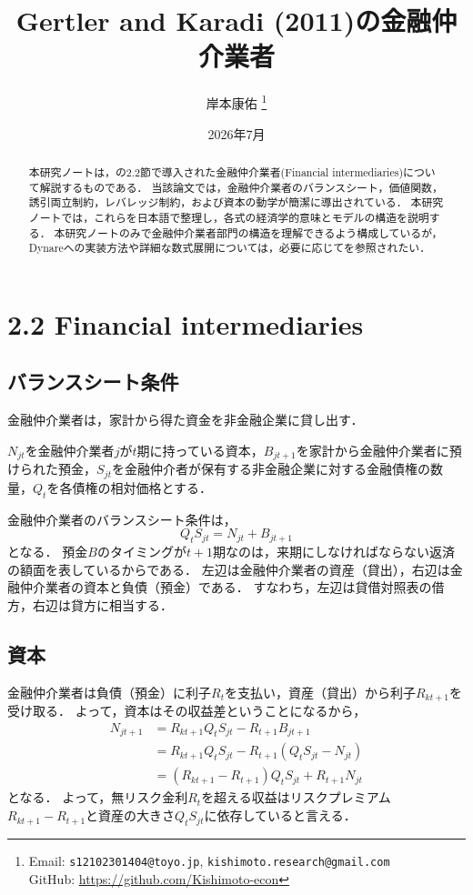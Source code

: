 \documentclass[dvipdfmx]{jlreq}
\title{
\vspace{-3cm}
Gertler and Karadi (2011)の金融仲介業者
}
\author{
  岸本康佑
  \thanks{
  Email: \texttt{s12102301404@toyo.jp}, \texttt{kishimoto.research@gmail.com} \\
  GitHub: \url{https://github.com/Kishimoto-econ}
}}
\date{2026年7月}
\begin{document}
\maketitle

\begin{abstract}
本研究ノートは，\textcite{GK2011}の2.2節で導入された金融仲介業者(Financial intermediaries)について解説するものである．
当該論文では，金融仲介業者のバランスシート，価値関数，誘引両立制約，レバレッジ制約，および資本の動学が簡潔に導出されている．
本研究ノートでは，これらを日本語で整理し，各式の経済学的意味とモデルの構造を説明する．
本研究ノートのみで金融仲介業者部門の構造を理解できるよう構成しているが，Dynareへの実装方法や詳細な数式展開については，必要に応じて\textcite{V2021}を参照されたい．
\end{abstract}

\section*{2.2 Financial intermediaries}
\subsection*{バランスシート条件}
金融仲介業者は，家計から得た資金を非金融企業に貸し出す．

$N_{jt}$を金融仲介業者$j$が$t$期に持っている資本，$B_{jt+1}$を家計から金融仲介業者に預けられた預金，$S_{jt}$を金融仲介者が保有する非金融企業に対する金融債権の数量，$Q_t$を各債権の相対価格とする．

金融仲介業者のバランスシート条件は，
\begin{equation}
  Q_t S_{jt} = N_{jt} + B_{jt+1}
\end{equation}
となる．
預金$B$のタイミングが$t+1$期なのは，来期にしなければならない返済の額面を表しているからである．
左辺は金融仲介業者の資産（貸出），右辺は金融仲介業者の資本と負債（預金）である．
すなわち，左辺は貸借対照表の借方，右辺は貸方に相当する．

\subsection*{資本}
金融仲介業者は負債（預金）に利子$R_t$を支払い，資産（貸出）から利子$R_{kt+1}$を受け取る．
よって，資本はその収益差ということになるから，
\begin{align}
  N_{jt+1} &= R_{kt+1} Q_t S_{jt} - R_{t+1} B_{jt+1} \\
  &= R_{kt+1} Q_t S_{jt} - R_{t+1} (Q_t S_{jt} - N_{jt}) \\
  &= (R_{kt+1} - R_{t+1}) Q_t S_{jt} + R_{t+1} N_{jt} \label{eq:7}
\end{align}
となる．
よって，無リスク金利$R_t$を超える収益はリスクプレミアム$R_{kt+1} - R_{t+1}$と資産の大きさ$Q_t S_{jt}$に依存していると言える．
\end{document}
